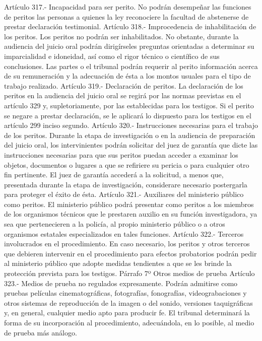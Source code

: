     Artículo 317.- Incapacidad para ser perito. No podrán desempeñar las funciones de peritos las personas a quienes la ley reconociere la facultad de abstenerse de prestar declaración testimonial.
    Artículo 318.- Improcedencia de inhabilitación de los peritos. Los peritos no podrán ser inhabilitados. No obstante, durante la audiencia del juicio oral podrán dirigírseles preguntas orientadas a determinar su imparcialidad e idoneidad, así como el rigor técnico o científico de sus conclusiones. Las partes o el tribunal podrán requerir al perito información acerca de su remuneración y la adecuación de ésta a los montos usuales para el tipo de trabajo realizado.
    Artículo 319.- Declaración de peritos. La declaración de los peritos en la audiencia del juicio oral se regirá por las normas previstas en el artículo 329 y, supletoriamente, por las establecidas para los testigos.
Si el perito se negare a prestar declaración, se le aplicará lo dispuesto para los testigos en el artículo 299 inciso segundo.
    Artículo 320.- Instrucciones necesarias para el trabajo de los peritos. Durante la etapa de investigación o en la audiencia de preparación del juicio oral, los intervinientes podrán solicitar del juez de garantía que dicte las instrucciones necesarias para que sus peritos puedan acceder a examinar los objetos, documentos o lugares a que se refiriere su pericia o para cualquier otro fin pertinente. El juez de garantía accederá a la solicitud, a menos que, presentada durante la etapa de investigación, considerare necesario postergarla para proteger el éxito de ésta.
    Artículo 321.- Auxiliares del ministerio público como peritos. El ministerio público podrá presentar como peritos a los miembros de los organismos técnicos que le prestaren auxilio en su función investigadora, ya sea que pertenecieren a la policía, al propio ministerio público o a otros organismos estatales especializados en tales funciones.
    Artículo 322.- Terceros involucrados en el procedimiento. En caso necesario, los peritos y otros terceros que debieren intervenir en el procedimiento para efectos probatorios podrán pedir al ministerio público que adopte medidas tendientes a que se les brinde la protección prevista para los testigos.
    Párrafo 7º Otros medios de prueba
    Artículo 323.- Medios de prueba no regulados expresamente. Podrán admitirse como pruebas películas cinematográficas, fotografías, fonografías, videograbaciones y otros sistemas de reproducción de la imagen o del sonido, versiones taquigráficas y, en general, cualquier medio apto para producir fe.
    El tribunal determinará la forma de su incorporación al procedimiento, adecuándola, en lo posible, al medio de prueba más análogo.
